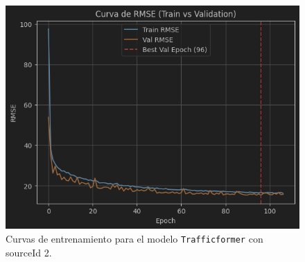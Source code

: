 \begin{figure}[H]
\begin{minipage}{0.48\textwidth}
		\vspace{0.2cm}
		\includegraphics[width=\linewidth]{includes/cap5/graphs/sid2_trafficformer_rmse.png}
	\end{minipage}
	\caption{Curvas de entrenamiento para el modelo \texttt{Trafficformer} con sourceId 2.}
	\label{fig:curvas_sid2_trafficformer}
\end{figure}


